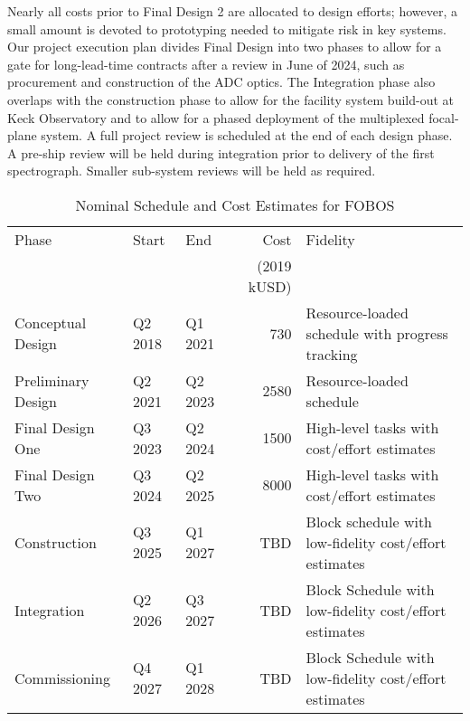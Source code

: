 Nearly all costs prior to Final Design 2 are allocated to design
efforts; however, a small amount is devoted to prototyping needed to
mitigate risk in key systems.  Our project execution plan divides Final
Design into two phases to allow for a gate for long-lead-time contracts
after a review in June of 2024, such as procurement and construction of
the ADC optics.  The Integration phase also overlaps with the
construction phase to allow for the facility system build-out at Keck
Observatory and to allow for a phased deployment of the multiplexed
focal-plane system.  A full project review is scheduled at the end of
each design phase.  A pre-ship review will be held during integration
prior to delivery of the first spectrograph.   Smaller sub-system
reviews will be held as required.

\begin{table}[h!]
\centering
\footnotesize
\caption{Nominal Schedule and Cost Estimates for FOBOS}
\label{tab:cost}
\vspace*{-10pt}
\begin{tabular}{l | l l r l }
\hline
Phase              &  Start  &     End &         Cost & Fidelity \\
                   &         &         &  (2019 kUSD) &  \\
\hline
\hline
Conceptual Design  & Q2 2018 & Q1 2021 &   730 & Resource-loaded schedule with progress tracking \\
Preliminary Design & Q2 2021 & Q2 2023 &  2580 & Resource-loaded schedule \\
Final Design One   & Q3 2023 & Q2 2024 &  1500 & High-level tasks with cost/effort estimates \\
Final Design Two   & Q3 2024 & Q2 2025 &  8000 & High-level tasks with cost/effort estimates \\
Construction       & Q3 2025 & Q1 2027 & TBD & Block schedule with low-fidelity cost/effort estimates \\
Integration        & Q2 2026 & Q3 2027 & TBD & Block Schedule with low-fidelity cost/effort estimates \\
Commissioning      & Q4 2027 & Q1 2028 &   TBD & Block Schedule with low-fidelity cost/effort estimates \\
\hline
\end{tabular}
\end{table}


